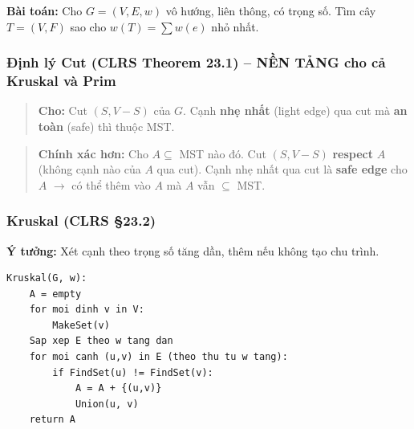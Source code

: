 \documentclass[10pt]{article}
\begin{document}
\textbf{Bài toán:} Cho \(G = (V, E, w)\) vô hướng, liên thông, có trọng
số. Tìm cây \(T = (V, F)\) sao cho \(w(T) = \sum w(e)\) nhỏ nhất.

\subsubsection{Định lý Cut (CLRS Theorem 23.1) -- NỀN TẢNG cho cả
Kruskal và
Prim}\label{ux111ux1ecbnh-luxfd-cut-clrs-theorem-23.1-nux1ec1n-tux1ea3ng-cho-cux1ea3-kruskal-vuxe0-prim}

\begin{quote}
\textbf{Cho:} Cut \((S, V-S)\) của \(G\). Cạnh \textbf{nhẹ nhất} (light
edge) qua cut mà \textbf{an toàn} (safe) thì thuộc MST.
\end{quote}

\begin{quote}
\textbf{Chính xác hơn:} Cho \(A \subseteq\) MST nào đó. Cut \((S, V-S)\)
\textbf{respect} \(A\) (không cạnh nào của \(A\) qua cut). Cạnh nhẹ nhất
qua cut là \textbf{safe edge} cho \(A\) \(\to\) có thể thêm vào \(A\) mà
\(A\) vẫn \(\subseteq\) MST.
\end{quote}

\subsubsection{\texorpdfstring{Kruskal (CLRS
\S 23.2)}{Kruskal (CLRS 23.2)}}\label{kruskal-clrs-23.2}

\textbf{Ý tưởng:} Xét cạnh theo trọng số tăng dần, thêm nếu không tạo
chu trình.

\begin{tcolorbox}[colback=gray!8, colframe=gray!50, boxrule=0.5pt, arc=2pt,
  left=6pt, right=6pt, top=4pt, bottom=4pt,
  title={\small\textbf{Pseudocode 13: Kruskal's Algorithm}}]
\begin{verbatim}
Kruskal(G, w):
    A = empty
    for moi dinh v in V:
        MakeSet(v)
    Sap xep E theo w tang dan
    for moi canh (u,v) in E (theo thu tu w tang):
        if FindSet(u) != FindSet(v):
            A = A + {(u,v)}
            Union(u, v)
    return A
\end{verbatim}
\end{tcolorbox}
\end{document}
